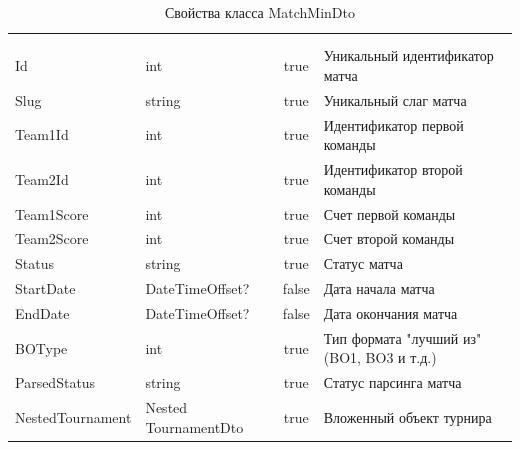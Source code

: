 \begin{xltabular}{\textwidth}{|X|X|c|X|}
	\caption{Свойства класса MatchMinDto}\label{table:MatchMinDto}\\ \hline
	 &  &  &  \\ \hline
	 &  &  &  \\ \hline
	\endfirsthead
	 \hline
	 &  &  &  \\ \hline
	\endhead
	Id & int & true & Уникальный идентификатор матча \\ \hline
	Slug & string & true & Уникальный слаг матча \\ \hline
	Team1Id & int & true & Идентификатор первой команды \\ \hline
	Team2Id & int & true & Идентификатор второй команды \\ \hline
	Team1Score & int & true & Счет первой команды \\ \hline
	Team2Score & int & true & Счет второй команды \\ \hline
	Status & string & true & Статус матча \\ \hline
	StartDate & DateTimeOffset? & false & Дата начала матча \\ \hline
	EndDate & DateTimeOffset? & false & Дата окончания матча \\ \hline
	BOType & int & true & Тип формата "лучший из" (BO1, BO3 и т.д.) \\ \hline
	ParsedStatus & string & true & Статус парсинга матча \\ \hline
	NestedTournament & Nested
	TournamentDto & true & Вложенный объект турнира \\ \hline
\end{xltabular}


